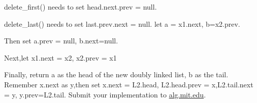 \documentclass[12pt,twoside]{article}
\begin{document}
\begin{problems}
\begin{problemparts}
delete\_first() needs to set head.next.prev = null.

delete\_last() needs to set last.prev.next = null.
\problempart %
let a = x1.next, b=x2.prev.

Then set a.prev = null, b.next=null.

Next,let x1.next = x2, x2.prev = x1

Finally, return a as the head of the new doubly linked list, b as the tail.
\problempart %
Remember x.next as y,then set x.next = L2.head, L2.head.prev = x,L2.tail.next = y,
y.prev=L2.tail.
\problempart Submit your implementation to {\small\url{alg.mit.edu}}.
\end{problemparts}

\end{problems}
\end{document}
